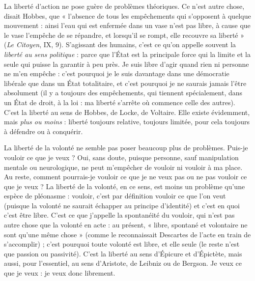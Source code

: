 {La liberté d’action ne pose guère de problèmes théoriques. Ce n’est autre
chose, disait Hobbes, que « l’absence de tous les empêchements qui s’opposent
à quelque mouvement : ainsi l’eau qui est enfermée dans un vase n’est pas libre,
à cause que le vase l'empêche de se répandre, et lorsqu'il se rompt, elle recouvre
sa liberté » ({\it Le Citoyen}, IX, 9). S'agissant des humains, c’est ce qu’on appelle
souvent la {\it liberté au sens politique} : parce que l’État est la principale force qui la
limite et la seule qui puisse la garantir à peu près. Je suis libre d’agir quand rien
ni personne ne m'en empêche : c’est pourquoi je le suis davantage dans une
démocratie libérale que dans un État totalitaire, et c’est pourquoi je ne saurais
jamais l’être absolument (il y a toujours des empêchements, qui tiennent spécialement,
dans un État de droit, à la loi : ma liberté s’arrête où commence celle
des autres). C’est la liberté au sens de Hobbes, de Locke, de Voltaire. Elle existe
évidemment, mais {\it plus ou moins} : liberté toujours relative, toujours limitée,
pour cela toujours à défendre ou à conquérir.

La liberté de la volonté ne semble pas poser beaucoup plus de problèmes.
Puis-je vouloir ce que je veux ? Oui, sans doute, puisque personne, sauf manipulation
mentale ou neurologique, ne peut m'empêcher de vouloir ni vouloir à
ma place. Au reste, comment pourrais-je vouloir ce que je ne veux pas ou ne
pas vouloir ce que je veux ? La liberté de la volonté, en ce sens, est moins un
problème qu’une espèce de pléonasme : vouloir, c’est par définition vouloir ce
que l’on veut (puisque la volonté ne saurait échapper au principe d’identité) et
c’est en quoi c’est être libre. C’est ce que j'appelle la spontanéité du vouloir, qui
n’est pas autre chose que la volonté en acte : au présent, « libre, spontané et
volontaire ne sont qu’une même chose » (comme le reconnaissait Descartes de
l'acte en train de s'accomplir) ; c'est pourquoi toute volonté est libre, et elle
seule (le reste n’est que passion ou passivité). C’est la liberté au sens d’Épicure
et d’Épictète, mais aussi, pour l'essentiel, au sens d’Aristote, de Leibniz ou de
Bergson. Je veux ce que je veux : je veux donc librement.

}
